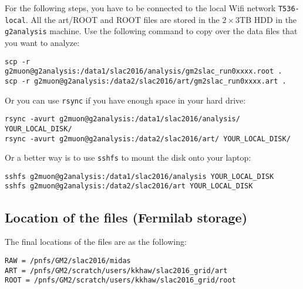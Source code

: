 For the following steps, you have to be connected to the local Wifi network \verb+T536-local+.
All the art/ROOT and ROOT files are stored in the $2\times3$TB HDD in the \verb+g2analysis+ machine.
Use the following command to copy over the data files that you want to analyze: 
%
\begin{lstlisting}[frame=single, basicstyle=\ttfamily\footnotesize]
scp -r g2muon@g2analysis:/data1/slac2016/analysis/gm2slac_run0xxxx.root . 
scp -r g2muon@g2analysis:/data2/slac2016/art/gm2slac_run0xxxx.art .
\end{lstlisting}
%
Or you can use \verb+rsync+ if you have enough space in your hard drive:
%
\begin{lstlisting}[frame=single, basicstyle=\ttfamily\footnotesize]
rsync -avurt g2muon@g2analysis:/data1/slac2016/analysis/ YOUR_LOCAL_DISK/
rsync -avurt g2muon@g2analysis:/data2/slac2016/art/ YOUR_LOCAL_DISK/
\end{lstlisting}
%
Or a better way is to use \verb+sshfs+ to mount the disk onto your laptop:
\begin{lstlisting}[frame=single, basicstyle=\ttfamily\footnotesize]
sshfs g2muon@g2analysis:/data1/slac2016/analysis YOUR_LOCAL_DISK
sshfs g2muon@g2analysis:/data2/slac2016/art YOUR_LOCAL_DISK
\end{lstlisting}

\subsection{Location of the files (Fermilab storage)}

The final locations of the files are as the following:

\begin{lstlisting}[frame=single, basicstyle=\ttfamily\footnotesize]
RAW = /pnfs/GM2/slac2016/midas
ART = /pnfs/GM2/scratch/users/kkhaw/slac2016_grid/art
ROOT = /pnfs/GM2/scratch/users/kkhaw/slac2016_grid/root
\end{lstlisting}